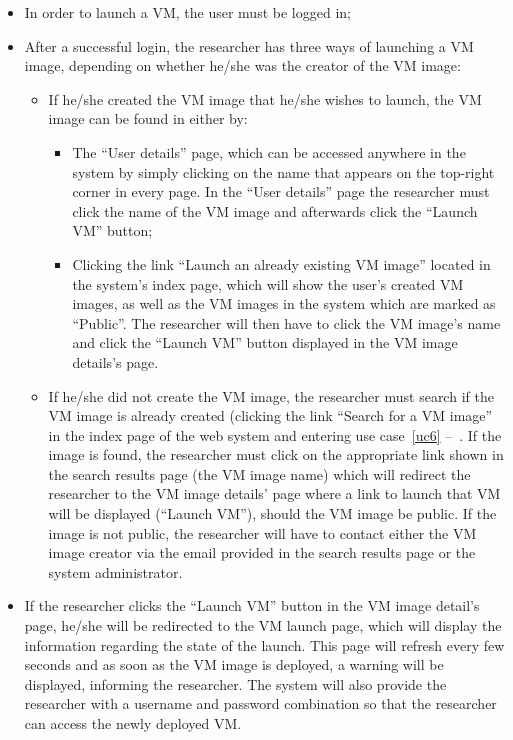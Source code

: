 \begin{itemize}
\item In order to launch a VM, the user must be logged in;
\item After a successful login, the researcher has three ways of launching a VM image, depending on whether he/she was the creator of the VM image:
	\begin{itemize}
	\item If he/she created the VM image that he/she wishes to launch, the VM image can be found in either by:
		\begin{itemize} 
		\item The ``User details'' page, which can be accessed anywhere in the system by simply clicking on the name that appears on the top-right corner in every page. In the ``User details'' page the researcher must click the name of the VM image and afterwards click the ``Launch VM'' button;
		\item Clicking the link ``Launch an already existing VM image'' located in the system's index page, which will show the user's created VM images, as well as the VM images in the system which are marked as ``Public''. The researcher will then have to click the VM image's name and click the ``Launch VM'' button displayed in the VM image details's page.
		\end{itemize}
	\item If he/she did not create the VM image, the researcher must search if the VM image is already created (clicking the link ``Search for a VM image'' in the index page of the web system and entering use case~\ref{uc6} --~. If the image is found, the researcher must click on the appropriate link shown in the search results page (the VM image name) which will redirect the researcher to the VM image details' page where a link to launch that VM will be displayed (``Launch VM''), should the VM image be public. If the image is not public, the researcher will have to contact either the VM image creator via the email provided in the search results page or the system administrator.
	\end{itemize}
\item If the researcher clicks the ``Launch VM'' button in the VM image detail's page, he/she will be redirected to the VM launch page, which will display the information regarding the state of the launch. This page will refresh every few seconds and as soon as the VM image is deployed, a warning will be displayed, informing the researcher. The system will also provide the researcher with a username and password combination so that the researcher can access the newly deployed VM.
\end{itemize}

